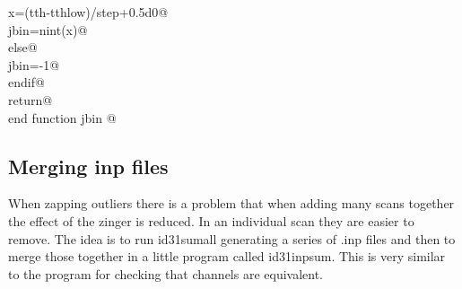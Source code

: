 \documentclass[10pt,a4paper,notitlepage]{article}
\begin{document}
\begin{flushleft}
\begin{list}{}{}
\mbox{}\verb@       x=(tth-tthlow)/step+0.5d0@\\
\mbox{}\verb@       jbin=nint(x)@\\
\mbox{}\verb@      else@\\
\mbox{}\verb@       jbin=-1@\\
\mbox{}\verb@      endif@\\
\mbox{}\verb@      return@\\
\mbox{}\verb@      end function jbin                                                     @{\NWsep}
\end{list}
\vspace{-1.5ex}
\footnotesize
\begin{list}{}{\setlength{\itemsep}{-\parsep}\setlength{\itemindent}{-\leftmargin}}

\item{}
\end{list}
\vspace{4ex}
\end{flushleft}
\subsection{Merging inp files}

When zapping outliers there is a problem that when adding many scans together
the effect of the zinger is reduced. 
In an individual scan they are easier to remove. The idea is to run
id31sumall generating a series of .inp files and then to merge those
together in a little program called id31inpsum. This is very similar to the
program for checking that channels are equivalent.
\end{document}
